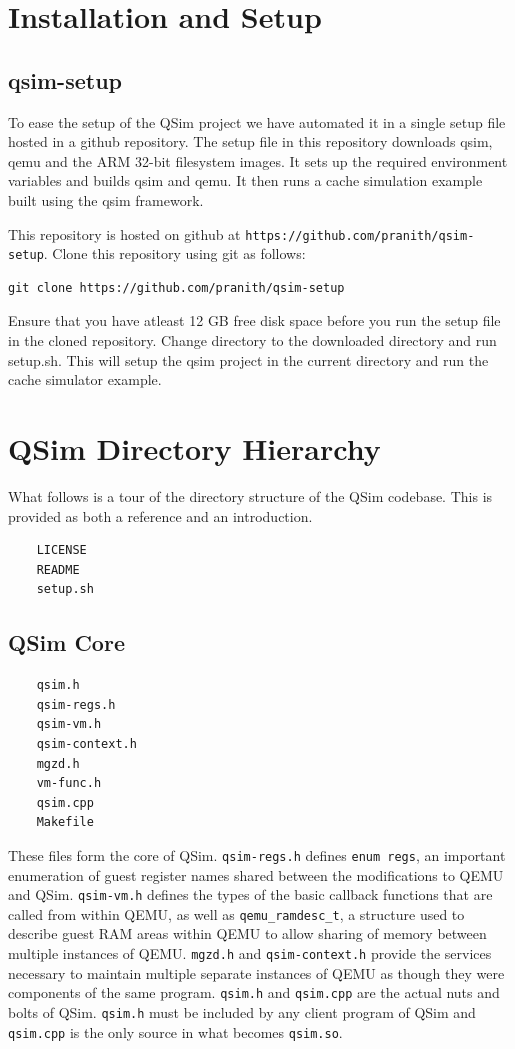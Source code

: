 \documentclass[letterpaper, 10pt]{book}
\newcommand{\url}[1]{\texttt{#1}}
\begin{document}
\section{Installation and Setup}

\subsection{qsim-setup}

To ease the setup of the QSim project we have automated it in a
single setup file hosted in a github repository. The setup file in this
repository downloads qsim, qemu and the ARM 32-bit filesystem images. It sets up
the required environment variables and builds
qsim and qemu. It then runs a cache simulation example built using the qsim
framework.

This repository is hosted on github at
\url{https://github.com/pranith/qsim-setup}. Clone this repository using git as
follows: \\
\begin{lstlisting}[frame=none]
 git clone https://github.com/pranith/qsim-setup
\end{lstlisting}

Ensure that you have atleast 12 GB free disk space before you run the setup file
in the cloned repository. Change directory to the downloaded directory and run
setup.sh. This will setup the qsim project in the current directory and run the
cache simulator example.

\section{QSim Directory Hierarchy}
What follows is a tour of the directory structure of the QSim codebase. This is
provided as both a reference and an introduction.
\begin{verbatim}
    LICENSE
    README
    setup.sh
\end{verbatim}

\subsection{QSim Core}

\begin{verbatim}
    qsim.h
    qsim-regs.h
    qsim-vm.h
    qsim-context.h
    mgzd.h
    vm-func.h
    qsim.cpp
    Makefile
\end{verbatim}
These files form the core of QSim. \texttt{qsim-regs.h} defines 
\texttt{enum regs}, an important enumeration of guest register names shared
between the modifications to QEMU and QSim. \texttt{qsim-vm.h} defines the
types of the basic callback functions that are called from within QEMU, as well
as \texttt{qemu\_ramdesc\_t}, a structure used to describe guest RAM areas
within QEMU to allow sharing of memory between multiple instances of QEMU.
\texttt{mgzd.h} and \texttt{qsim-context.h} provide the services necessary to
maintain multiple separate instances of QEMU as though they were components of
the same program. \texttt{qsim.h} and \texttt{qsim.cpp} are the actual nuts
and bolts of QSim. \texttt{qsim.h} must be included by any client program
of QSim and \texttt{qsim.cpp} is the only source in what becomes
\texttt{qsim.so}.
\end{document}
